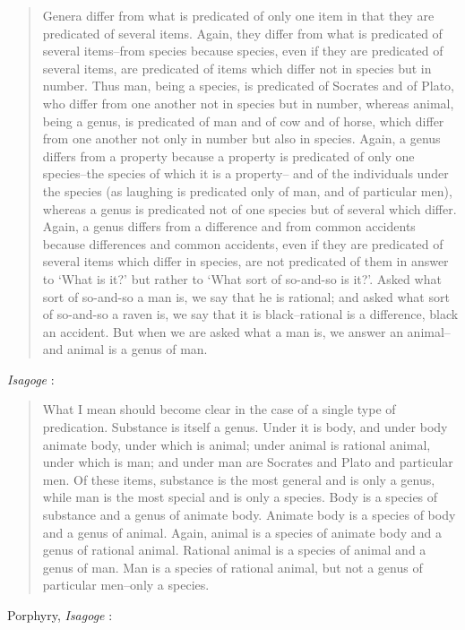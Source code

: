 \documentclass{article}
\begin{document}
\begin{quote}
Genera differ from what is predicated of only one item in that they are predicated of several items. Again, they differ from what is predicated of several items--from species because species, even if they are predicated of several items, are predicated of items which differ not in species but in number. Thus man, being a species, is predicated of Socrates and of Plato, who differ from one another not in species but in number, whereas animal, being a genus, is predicated of man and of cow and of horse, which differ from one another not only in number but also in species. Again, a genus differs from a property because a property is predicated of only one species--the species of which it is a property-- and of the individuals under the species (as laughing is predicated only of man, and of particular men), whereas a genus is predicated not of one species but of several which differ. Again, a genus differs from a
difference and from common accidents because differences and common accidents, even if they are predicated of several items which differ in species, are not predicated of them in answer to `What is it?' but rather to `What sort of so-and-so is it?'. Asked what sort of so-and-so a man
is, we say that he is rational; and asked what sort of so-and-so a raven is, we say that it is black--rational is a difference, black an accident. But when we are asked what a man is, we answer an animal--and animal is a genus of man.
\end{quote}

{\em Isagoge} \cite[p.~6, \S 2]{isagoge}:

\begin{quote}
What I mean should become clear in the case of a single type of predication. Substance is itself a genus. Under it is body, and under body animate body, under which is animal; under 
animal is rational animal, under which is man; and under man are Socrates and Plato and particular men. Of these items, substance is the most general and is only a genus, while man is 
the most special and is only a species. Body is a species of substance and a genus of animate body. Animate body is a species of body and a genus of animal. Again, animal is a species 
of animate body and a genus of rational animal. Rational animal is a species of animal and a genus of man. Man is a species of rational animal, but not a genus of particular men--only a species.
\end{quote}

Porphyry, {\em Isagoge} \cite[p.~7, \S 2]{isagoge}:
\end{document}
